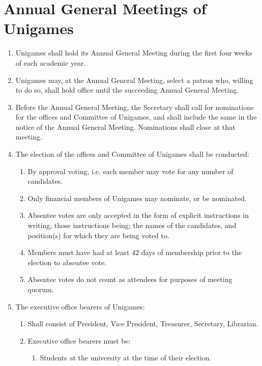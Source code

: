 \documentclass[a4paper]{article}
\begin{document}
\section{Annual General Meetings of Unigames} \label{sec:annual_general_meetings}
\begin{enumerate}
    \item Unigames shall hold its Annual General Meeting during the first four weeks of each academic year.
    \item Unigames may, at the Annual General Meeting, select a patron who, willing to do so, shall hold office until the succeeding Annual General Meeting.
    \item Before the Annual General Meeting, the Secretary shall call for nominations for the offices and Committee of Unigames, and shall include the same in the notice of the Annual General Meeting. Nominations shall close at that meeting.
    \item The election of the offices and Committee of Unigames shall be conducted:
          \begin{enumerate}
              \item By approval voting, i.e. each member may vote for any number of candidates.
              \item Only financial members of Unigames may nominate, or be nominated.
              \item Absentee votes are only accepted in the form of explicit instructions in writing, those instructions being; the names of the candidates, and position(s) for which they are being voted to.
              \item Members must have had at least 42 days of membership prior to the election to absentee vote.
              \item Absentee votes do not count as attendees for purposes of meeting quorum.
          \end{enumerate}
    \item The executive office bearers of Unigames:
          \begin{enumerate}
              \item \label{todo_Office_bearers} Shall consist of President, Vice President, Treasurer, Secretary, Librarian.
              \item \label{todo_enu_Guild_Exect_Rules} Executive office bearers must be:
                    \begin{enumerate}
                        \item Students at the university at the time of their election.

\end{enumerate}
\end{enumerate}
\end{enumerate}
\end{document}
